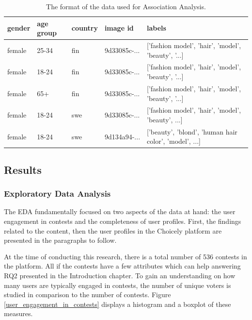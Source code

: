     \begin{table}[]
        \centering
        \begin{tabular}{l|l|l|l|l}
            gender & age group & country & image id & labels \\
            \hline
            female & 25-34 & fin & 9d33085c-... & ['fashion model', 'hair', 'model', 'beauty', '...] \\
            female & 18-24 & fin & 9d33085c-... & ['fashion model', 'hair', 'model', 'beauty', '...] \\
            female & 65+ & fin & 9d33085c-... & ['fashion model', 'hair', 'model', 'beauty', '...] \\
            female & 18-24 & swe & 9d33085c-... & ['fashion model', 'hair', 'model', 'beauty', ...] \\
            female & 18-24 & swe & 9d134a94-... & ['beauty', 'blond', 'human hair color', 'model', ...]
        \end{tabular}
        \caption{The format of the data used for Association Analysis.}
        \label{association_analyisis_data}
    \end{table}

    

\subsection{Results}
    \subsubsection{Exploratory Data Analysis}
    The EDA fundamentally focused on two aspects of the data at hand: the user engagement in contests and the completeness of user profiles. First, the findings related to the content, then the user profiles in the Choicely platform are presented in the paragraphs to follow.
    
        At the time of conducting this research, there is a total number of 536 contests in the platform. All if the contests have a few attributes which can help answering RQ2 presented in the Introduction chapter. To gain an understanding on how many users are typically engaged in contests, the number of unique voters is studied in comparison to the number of contests. Figure \ref{user_engagement_in_contests} displays a histogram and a boxplot of these measures. 
        
